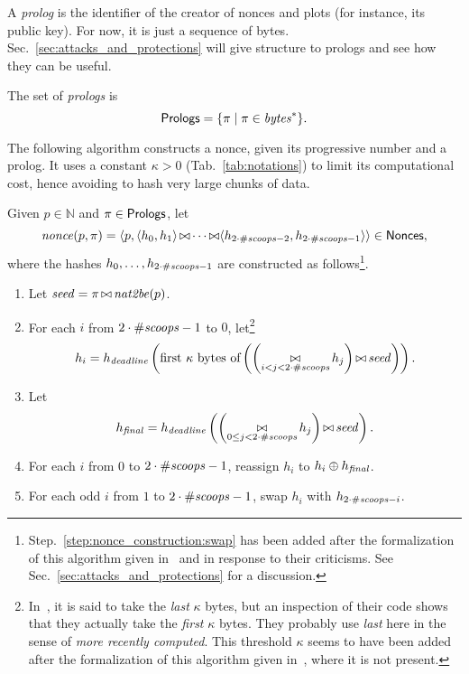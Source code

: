 A \emph{prolog} is the identifier of the creator of nonces and plots (for instance, its public key).
For now, it is just a sequence of bytes. Sec.~\ref{sec:attacks_and_protections}
will give structure to prologs and see how they can be useful.
%
\begin{definition}[Prolog]\label{def:prolog}
  The set of \emph{prologs} is
  \[
  {\mathsf{Prologs}}=\{\pi\mid\pi\in\mathit{bytes}^*\}.
  \]
\end{definition}
%
The following algorithm constructs a nonce, given its progressive number and a prolog.
It uses a constant $\kappa>0$ (Tab.~\ref{tab:notations})
to limit its computational cost, hence avoiding to hash very large chunks of data.
%
\begin{alg}[$\nonce(p,\pi)$]\label{alg:nonce_construction}
  Given $p\in\mathbb{N}$ and $\pi\in{\mathsf{Prologs}}$, let
  \[
  {\mathit{nonce}}(p,\pi)=\langle p,\langle h_0,h_1\rangle\operatorname*{\bowtie}
  \cdots\operatorname*{\bowtie}\langle h_{2\cdot{\#\mathit{scoops}}-2},h_{2\cdot{\#\mathit{scoops}}-1}\rangle\rangle\in{\mathsf{Nonces}},
  \]
  where the hashes $h_0,\ldots,h_{2\cdot{\#\mathit{scoops}}-1}$ are constructed as
  follows\footnote{Step.~\ref{step:nonce_construction:swap} has been added
  after the formalization of this algorithm given in~\cite{ParkPAFG15} and
  in response to their criticisms. See Sec.~\ref{sec:attacks_and_protections} for a discussion.}.
  \begin{enumerate}
  \item Let ${\mathit{seed}}=\pi\operatorname*{\bowtie}{\mathit{nat2be}}(p)$.
  \item\label{step:nonce_construction:first_hash}
    For each $i$ from $2\cdot{\#\mathit{scoops}}-1$ to $0$,
    let\footnote{In~\cite{SignumPlotting}, it is said to
    take the \emph{last} $\kappa$ bytes, but an inspection of their code
    shows that they actually take the \emph{first} $\kappa$ bytes. They
    probably use \emph{last} here in the sense of \emph{more recently computed}.
    This threshold $\kappa$ seems to have been added after the formalization of
    this algorithm given in~\cite{ParkPAFG15}, where it is not present.}
    \[
    h_i=h_{\mathit{deadline}}\left(\text{first $\kappa$ bytes of}\left(\left(\operatorname*{\bowtie}_{i<j<2\cdot{\#\mathit{scoops}}}h_j\right)\operatorname*{\bowtie}{\mathit{seed}}\right)\right).
    \]
  \item\label{step:nonce_construction:final_hash}
    Let
    \[
    {h_{\mathit{final}}}=h_{\mathit{deadline}}\left(\left(\operatorname*{\bowtie}_{0\le j<2\cdot{\#\mathit{scoops}}}h_j\right)\operatorname*{\bowtie}{\mathit{seed}}\right).
    \]
  \item For each $i$ from $0$ to $2\cdot{\#\mathit{scoops}}-1$, reassign
    $h_i$ to $h_i\oplus{h_{\mathit{final}}}$.
  \item\label{step:nonce_construction:swap}
    For each odd $i$ from $1$ to $2\cdot{\#\mathit{scoops}}-1$, swap
    $h_i$ with $h_{2\cdot{\#\mathit{scoops}}-i}$.
  \end{enumerate}
\end{alg}
